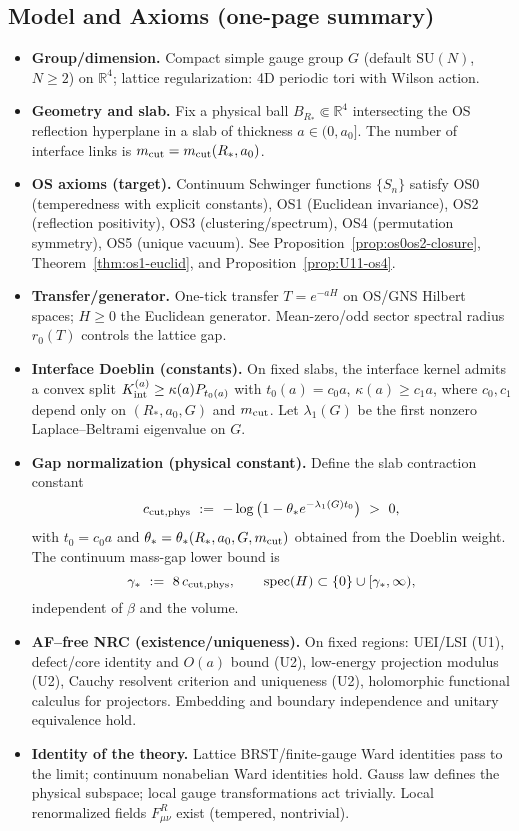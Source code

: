 \documentclass[11pt]{amsart}
\theoremstyle{plain}
\theoremstyle{definition}
\theoremstyle{remark}
\begin{document}
\subsection*{Model and Axioms (one-page summary)}
\begin{itemize}
  \item \textbf{Group/dimension.} Compact simple gauge group $G$ (default $\mathrm{SU}(N)$, $N\ge 2$) on $\mathbb R^4$; lattice regularization: 4D periodic tori with Wilson action.
  \item \textbf{Geometry and slab.} Fix a physical ball $B_{R_*}\Subset\mathbb R^4$ intersecting the OS reflection hyperplane in a slab of thickness $a\in(0,a_0]$. The number of interface links is $m_{\rm cut}=m_{\rm cut}(R_*,a_0)$.
  \item \textbf{OS axioms (target).} Continuum Schwinger functions $\{S_n\}$ satisfy OS0 (temperedness with explicit constants), OS1 (Euclidean invariance), OS2 (reflection positivity), OS3 (clustering/spectrum), OS4 (permutation symmetry), OS5 (unique vacuum). See Proposition~\ref{prop:os0os2-closure}, Theorem~\ref{thm:os1-euclid}, and Proposition~\ref{prop:U11-os4}.
  \item \textbf{Transfer/generator.} One-tick transfer $T=e^{-aH}$ on OS/GNS Hilbert spaces; $H\ge 0$ the Euclidean generator. Mean-zero/odd sector spectral radius $r_0(T)$ controls the lattice gap.
  \item \textbf{Interface Doeblin (constants).} On fixed slabs, the interface kernel admits a convex split $K_{\rm int}^{(a)}\ge \kappa(a) P_{t_0(a)}$ with $t_0(a)=c_0 a$, $\kappa(a)\ge c_1 a$, where $c_0,c_1$ depend only on $(R_*,a_0,G)$ and $m_{\rm cut}$. Let $\lambda_1(G)$ be the first nonzero Laplace–Beltrami eigenvalue on $G$.
  \item \textbf{Gap normalization (physical constant).} Define the slab contraction constant
  \[
    c_{\rm cut,phys}\ :=\ -\log\big(1-\theta_* e^{-\lambda_1(G) t_0}\big)\ >\ 0,
  \]
  with $t_0=c_0 a$ and $\theta_*=\theta_*(R_*,a_0,G,m_{\rm cut})$ obtained from the Doeblin weight. The continuum mass-gap lower bound is
  \[
    \gamma_*\ :=\ 8\,c_{\rm cut,phys},\qquad \operatorname{spec}(H)\subset\{0\}\cup[\gamma_*,\infty),
  \]
  independent of $\beta$ and the volume.
  \item \textbf{AF–free NRC (existence/uniqueness).} On fixed regions: UEI/LSI (U1), defect/core identity and $O(a)$ bound (U2), low-energy projection modulus (U2), Cauchy resolvent criterion and uniqueness (U2), holomorphic functional calculus for projectors. Embedding and boundary independence and unitary equivalence hold.
  \item \textbf{Identity of the theory.} Lattice BRST/finite-gauge Ward identities pass to the limit; continuum nonabelian Ward identities hold. Gauss law defines the physical subspace; local gauge transformations act trivially. Local renormalized fields $F_{\mu\nu}^R$ exist (tempered, nontrivial).
\end{itemize}
\end{document}
